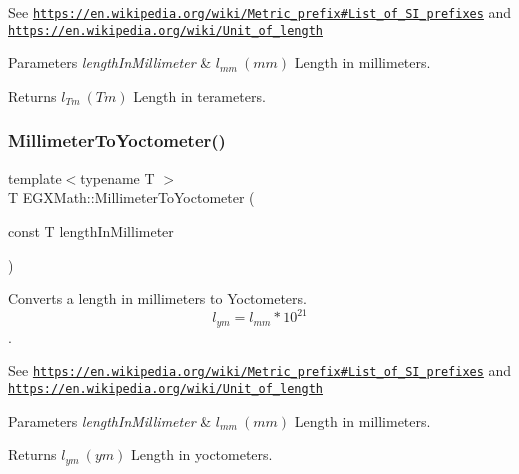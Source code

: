 See \href{https://en.wikipedia.org/wiki/Metric_prefix#List_of_SI_prefixes}{\tt https\+://en.\+wikipedia.\+org/wiki/\+Metric\+\_\+prefix\#\+List\+\_\+of\+\_\+\+S\+I\+\_\+prefixes} and \href{https://en.wikipedia.org/wiki/Unit_of_length}{\tt https\+://en.\+wikipedia.\+org/wiki/\+Unit\+\_\+of\+\_\+length} 
\begin{DoxyParams}{Parameters}
{\em length\+In\+Millimeter} & $ l_{mm}\ (mm)$ Length in millimeters. \\
\hline
\end{DoxyParams}
\begin{DoxyReturn}{Returns}
$ l_{Tm}\ (Tm)$ Length in terameters. 
\end{DoxyReturn}
\mbox{\label{group___e_g_x_math-_conversions-_length_conversions-_millimeter-_s_i_ga7f8020bb633d6ed2cd874a8c66d2893d}} 
\subsubsection{\texorpdfstring{Millimeter\+To\+Yoctometer()}{MillimeterToYoctometer()}}
{\footnotesize\ttfamily template$<$typename T $>$ \\
T E\+G\+X\+Math\+::\+Millimeter\+To\+Yoctometer (\begin{DoxyParamCaption}\item[{const T}]{length\+In\+Millimeter }\end{DoxyParamCaption})}



Converts a length in millimeters to Yoctometers. \[ l_{ym}=l_{mm} * 10^{21} \]. 

See \href{https://en.wikipedia.org/wiki/Metric_prefix#List_of_SI_prefixes}{\tt https\+://en.\+wikipedia.\+org/wiki/\+Metric\+\_\+prefix\#\+List\+\_\+of\+\_\+\+S\+I\+\_\+prefixes} and \href{https://en.wikipedia.org/wiki/Unit_of_length}{\tt https\+://en.\+wikipedia.\+org/wiki/\+Unit\+\_\+of\+\_\+length} 
\begin{DoxyParams}{Parameters}
{\em length\+In\+Millimeter} & $ l_{mm}\ (mm)$ Length in millimeters. \\
\hline
\end{DoxyParams}
\begin{DoxyReturn}{Returns}
$ l_{ym}\ (ym)$ Length in yoctometers. 
\end{DoxyReturn}
\mbox{\label{group___e_g_x_math-_conversions-_length_conversions-_millimeter-_s_i_ga0c63bb9317c6f47942e00d23d0bf9762}} 
